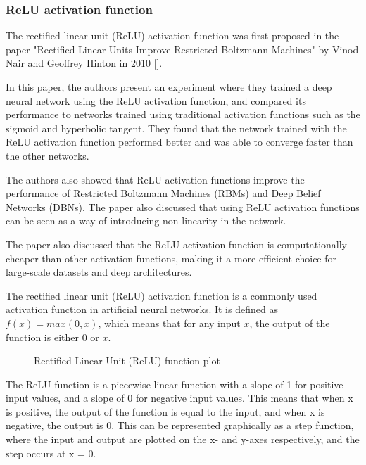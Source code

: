\documentclass[a4paper]{article}
\begin{document}
\subsubsection{ReLU activation function} \label{relu}

The rectified linear unit (ReLU) activation function was first proposed in the paper "Rectified Linear Units Improve Restricted Boltzmann Machines" by Vinod Nair and Geoffrey Hinton in 2010 [\cite{nair2010rectified}].

In this paper, the authors present an experiment where they trained a deep neural network using the ReLU activation function, and compared its performance to networks trained using traditional activation functions such as the sigmoid and hyperbolic tangent. They found that the network trained with the ReLU activation function performed better and was able to converge faster than the other networks.

The authors also showed that ReLU activation functions improve the performance of Restricted Boltzmann Machines (RBMs) and Deep Belief Networks (DBNs). The paper also discussed that using ReLU activation functions can be seen as a way of introducing non-linearity in the network.

The paper also discussed that the ReLU activation function is computationally cheaper than other activation functions, making it a more efficient choice for large-scale datasets and deep architectures.

The rectified linear unit (ReLU) activation function is a commonly used activation function in artificial neural networks. It is defined as $f(x) = max(0,x)$, which means that for any input $x$, the output of the function is either 0 or $x$.

\begin{figure}[!h]
\centering
{}
\caption{Rectified Linear Unit (ReLU) function plot}
\end{figure}

The ReLU function is a piecewise linear function with a slope of 1 for positive input values, and a slope of 0 for negative input values. This means that when x is positive, the output of the function is equal to the input, and when x is negative, the output is 0. This can be represented graphically as a step function, where the input and output are plotted on the x- and y-axes respectively, and the step occurs at x = 0.
\end{document}
